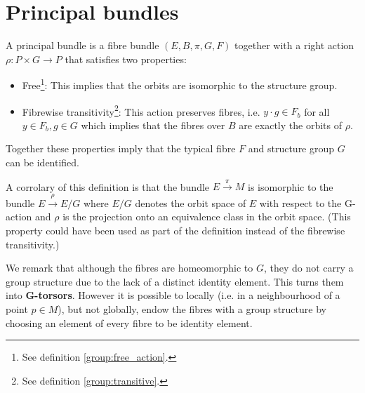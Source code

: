 
\section{Principal bundles}\label{manifolds:section:principal_bundles}

	\begin{definition}
		A principal bundle is a fibre bundle $(E, B, \pi, G, F)$ together with a right action $\rho:P\times G\rightarrow P$ that satisfies two properties:
		\begin{itemize}
			\item Free\footnote{See definition \ref{group:free_action}.}: This implies that the orbits are isomorphic to the structure group.
			\item Fibrewise transitivity\footnote{See definition \ref{group:transitive}.}: This action preserves fibres, i.e. $y\cdot g\in F_b$ for all $y\in F_b, g\in G$ which implies that the fibres over $B$ are exactly the orbits of $\rho$.
		\end{itemize}
		Together these properties imply that the typical fibre $F$ and structure group $G$ can be identified.
	\end{definition}
	\begin{remark}
		A corrolary of this definition is that the bundle $E\xrightarrow{\pi}M$ is isomorphic to the bundle $E\xrightarrow{\rho}E/G$ where $E/G$ denotes the orbit space of $E$ with respect to the G-action and $\rho$ is the projection onto an equivalence class in the orbit space. (This property could have been used as part of the definition instead of the fibrewise transitivity.)
	\end{remark}
	\begin{remark}
		We remark that although the fibres are homeomorphic to $G$, they do not carry a group structure due to the lack of a distinct identity element. This turns them into \textbf{G-torsors}. However it is possible to locally (i.e. in a neighbourhood of a point $p\in M$), but not globally, endow the fibres with a group structure by choosing an element of every fibre to be identity element.
	\end{remark}
	
